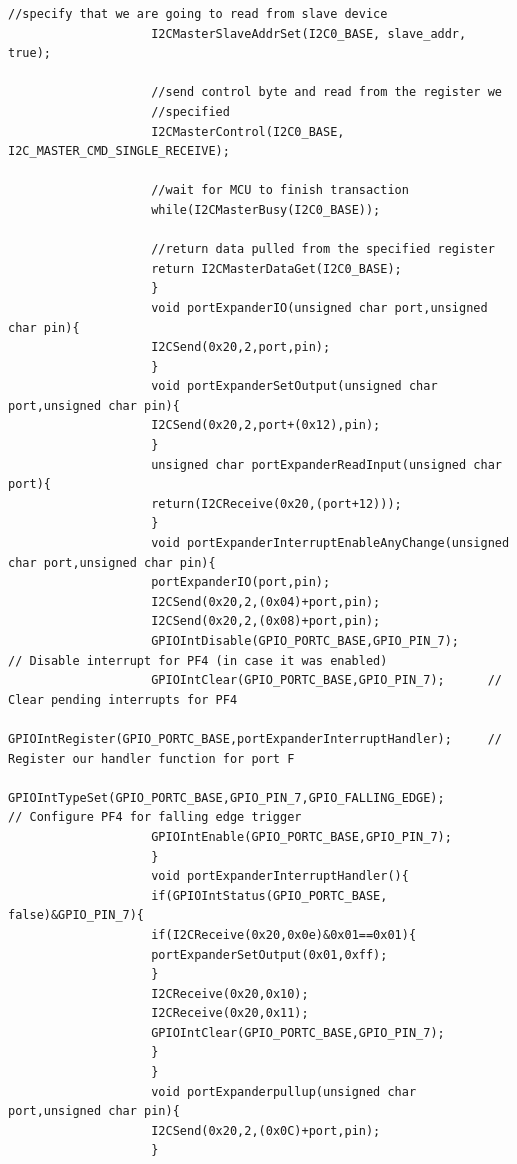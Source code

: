 \documentclass[a4paper,10pt,oneside]{article}
\begin{document}
\begin{lstlisting}[style=CStyle]
					//specify that we are going to read from slave device
					I2CMasterSlaveAddrSet(I2C0_BASE, slave_addr, true);
					
					//send control byte and read from the register we
					//specified
					I2CMasterControl(I2C0_BASE, I2C_MASTER_CMD_SINGLE_RECEIVE);
					
					//wait for MCU to finish transaction
					while(I2CMasterBusy(I2C0_BASE));
					
					//return data pulled from the specified register
					return I2CMasterDataGet(I2C0_BASE);
					}
					void portExpanderIO(unsigned char port,unsigned char pin){
					I2CSend(0x20,2,port,pin);
					}
					void portExpanderSetOutput(unsigned char port,unsigned char pin){
					I2CSend(0x20,2,port+(0x12),pin);
					}
					unsigned char portExpanderReadInput(unsigned char port){
					return(I2CReceive(0x20,(port+12)));
					}
					void portExpanderInterruptEnableAnyChange(unsigned char port,unsigned char pin){
					portExpanderIO(port,pin);
					I2CSend(0x20,2,(0x04)+port,pin);
					I2CSend(0x20,2,(0x08)+port,pin);
					GPIOIntDisable(GPIO_PORTC_BASE,GPIO_PIN_7);        // Disable interrupt for PF4 (in case it was enabled)
					GPIOIntClear(GPIO_PORTC_BASE,GPIO_PIN_7);      // Clear pending interrupts for PF4
					GPIOIntRegister(GPIO_PORTC_BASE,portExpanderInterruptHandler);     // Register our handler function for port F
					GPIOIntTypeSet(GPIO_PORTC_BASE,GPIO_PIN_7,GPIO_FALLING_EDGE);             // Configure PF4 for falling edge trigger
					GPIOIntEnable(GPIO_PORTC_BASE,GPIO_PIN_7);
					}
					void portExpanderInterruptHandler(){
					if(GPIOIntStatus(GPIO_PORTC_BASE, false)&GPIO_PIN_7){
					if(I2CReceive(0x20,0x0e)&0x01==0x01){
					portExpanderSetOutput(0x01,0xff);
					}
					I2CReceive(0x20,0x10);
					I2CReceive(0x20,0x11);
					GPIOIntClear(GPIO_PORTC_BASE,GPIO_PIN_7);
					}
					}
					void portExpanderpullup(unsigned char port,unsigned char pin){
					I2CSend(0x20,2,(0x0C)+port,pin);
					}
					
				\end{lstlisting}
\end{document}
